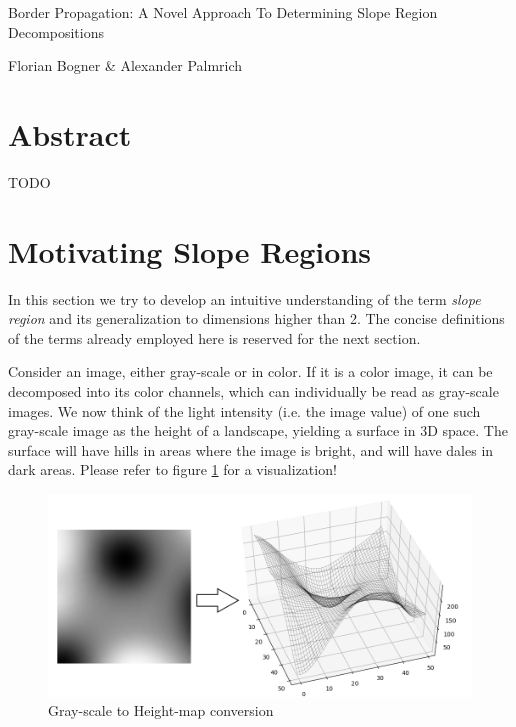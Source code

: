 \documentclass[a4paper,12pt]{paper}
\theoremstyle{plain}
\theoremstyle{definition}
\begin{document}
\begin{titlepage}
\huge
\centering
Border Propagation: A Novel Approach To Determining Slope Region Decompositions

\vfill

\normalsize
Florian Bogner \& Alexander Palmrich
\end{titlepage}




\tableofcontents
\newpage


\section{Abstract}

TODO

\section{Motivating Slope Regions}

In this section we try to develop an intuitive understanding of the term \emph{slope region} and its generalization to dimensions higher than 2. The concise definitions of the terms already employed here is reserved for the next section.

Consider an image, either gray-scale or in color. If it is a color image, it can be decomposed into its color channels, which can individually be read as gray-scale images. We now think of the light intensity (i.e. the image value) of one such gray-scale image as the height of a landscape, yielding a surface in 3D space. The surface will have hills in areas where the image is bright, and will have dales in dark areas. Please refer to figure \ref{fig:conversion} for a visualization!


\begin{figure}[h]
\includegraphics[width=\textwidth]{img/visu1.png}
\caption{Gray-scale to Height-map conversion}
\label{fig:conversion}
\end{figure}
\end{document}
